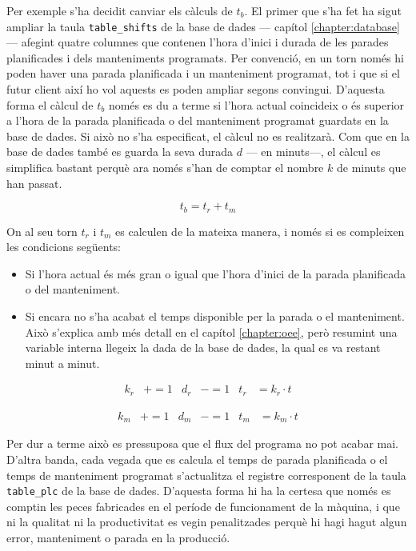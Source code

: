 \documentclass{tfgitic}[2022/06/30]
\begin{document}
Per exemple s'ha decidit canviar els càlculs de $t_{b}$. El primer que s'ha fet ha sigut ampliar la taula \texttt{table\_shifts} de la base de dades --- capítol \ref{chapter:database} --- afegint quatre columnes que contenen l'hora d'inici i durada de les parades planificades i dels manteniments programats. Per convenció, en un torn només hi poden haver una parada planificada i un manteniment programat, tot i que si el futur client així ho vol aquests es poden ampliar segons convingui. D'aquesta forma el càlcul de $t_{b}$ només es du a terme si l'hora actual coincideix o és superior a l'hora de la parada planificada o del manteniment programat guardats en la base de dades. Si això no s'ha especificat, el càlcul no es realitzarà. Com que en la base de dades també es guarda la seva durada $d$ --- en minuts---, el càlcul es simplifica bastant perquè ara només s'han de comptar el nombre $k$ de minuts que han passat.

\[t_{b} = t_{r} + t_{m}\]

On al seu torn $t_{r}$ i $t_{m}$ es calculen de la mateixa manera, i només si es compleixen les condicions següents:

\begin{itemize}
    \item Si l'hora actual és més gran o igual que l'hora d'inici de la parada planificada o del manteniment.
    \item Si encara no s'ha acabat el temps disponible per la parada o el manteniment. Això s'explica amb més detall en el capítol \ref{chapter:oee}, però resumint una variable interna llegeix la dada de la base de dades, la qual es va restant minut a minut.
\end{itemize}

\begin{align*}
k_{r}&+= 1 & d_{r} &-= 1 & t_{r} &= k_{r} \cdot t
\end{align*}

\begin{align*}
k_{m}&+= 1 & d_{m} &-= 1 & t_{m} &= k_{m} \cdot t
\end{align*}

Per dur a terme això es pressuposa que el flux del programa no pot acabar mai. D'altra banda, cada vegada que es calcula el temps de parada planificada o el temps de manteniment programat s'actualitza el registre corresponent de la taula \texttt{table\_plc} de la base de dades. D'aquesta forma hi ha la certesa que només es comptin les peces fabricades en el període de funcionament de la màquina, i que ni la qualitat ni la productivitat es vegin penalitzades perquè hi hagi hagut algun error, manteniment o parada en la producció.
\end{document}
